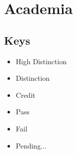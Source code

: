 \documentclass[12pt,a4paper,oneside]{article}
\newcommand{\sh}[1]{{\color{gray}{#1}}}
\newcommand{\uniHD}[1]{\colorbox{blue!25}{#1}}
\newcommand{\uniD}[1]{\colorbox{green!25}{#1}}
\newcommand{\uniC}[1]{\colorbox{yellow!25}{#1}}
\newcommand{\uniP}[1]{\colorbox{orange!25}{#1}}
\newcommand{\uniF}[1]{\colorbox{red!25}{#1}}
\newcommand{\uniU}[1]{\colorbox{gray!25}{#1}}
\begin{document}
\newpage
\section{Academia}

\setcounter{subsection}{-1}
\subsection{Keys}
\begin{multicols}{3}
\begin{itemize}
    \item \uniHD{High Distinction}
    \item \uniD{Distinction}
    \item \uniC{Credit}
    \item \uniP{Pass}
    \item \uniF{Fail}
    \item \uniU{Pending...}
\end{itemize}
\end{multicols}
\addtocounter{subsection}{1}
{}
\addtocounter{subsection}{-1}
\end{document}
